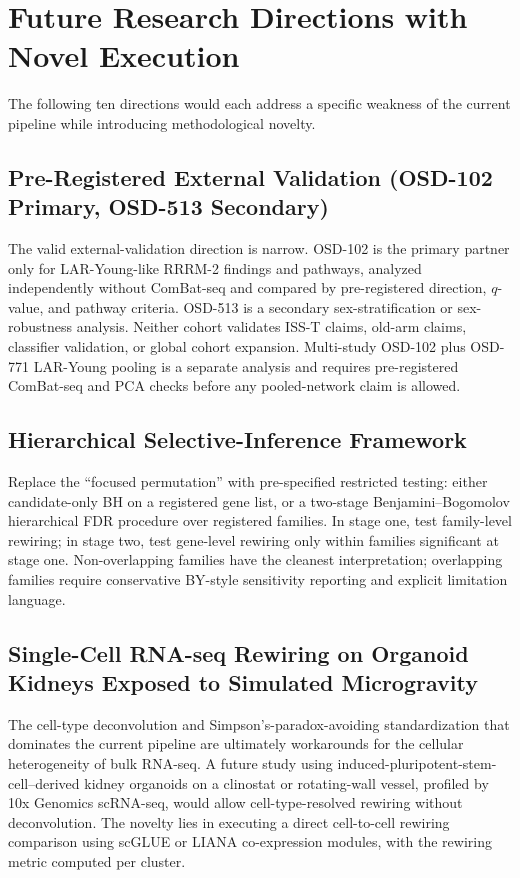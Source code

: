 \documentclass[11pt]{article}
\newcommand{\pkg}[1]{\textsf{#1}}
\begin{document}
\section{Future Research Directions with Novel Execution}

The following ten directions would each address a specific weakness of the current pipeline while introducing methodological novelty.

\subsection{Pre-Registered External Validation (OSD-102 Primary, OSD-513 Secondary)}
The valid external-validation direction is narrow. OSD-102 is the primary partner only for LAR-Young-like RRRM-2 findings and pathways, analyzed independently without ComBat-seq and compared by pre-registered direction, $q$-value, and pathway criteria. OSD-513 is a secondary sex-stratification or sex-robustness analysis. Neither cohort validates ISS-T claims, old-arm claims, classifier validation, or global cohort expansion. Multi-study OSD-102 plus OSD-771 LAR-Young pooling is a separate analysis and requires pre-registered ComBat-seq and PCA checks before any pooled-network claim is allowed.

\subsection{Hierarchical Selective-Inference Framework}
Replace the ``focused permutation'' with pre-specified restricted testing: either candidate-only BH on a registered gene list, or a two-stage Benjamini--Bogomolov hierarchical FDR procedure over registered families. In stage one, test family-level rewiring; in stage two, test gene-level rewiring only within families significant at stage one. Non-overlapping families have the cleanest interpretation; overlapping families require conservative BY-style sensitivity reporting and explicit limitation language.

\subsection{Single-Cell RNA-seq Rewiring on Organoid Kidneys Exposed to Simulated Microgravity}
The cell-type deconvolution and Simpson's-paradox-avoiding standardization that dominates the current pipeline are ultimately workarounds for the cellular heterogeneity of bulk RNA-seq. A future study using induced-pluripotent-stem-cell--derived kidney organoids on a clinostat or rotating-wall vessel, profiled by 10x Genomics scRNA-seq, would allow cell-type-resolved rewiring without deconvolution. The novelty lies in executing a direct cell-to-cell rewiring comparison using \pkg{scGLUE} or \pkg{LIANA} co-expression modules, with the rewiring metric computed per cluster.
\end{document}
